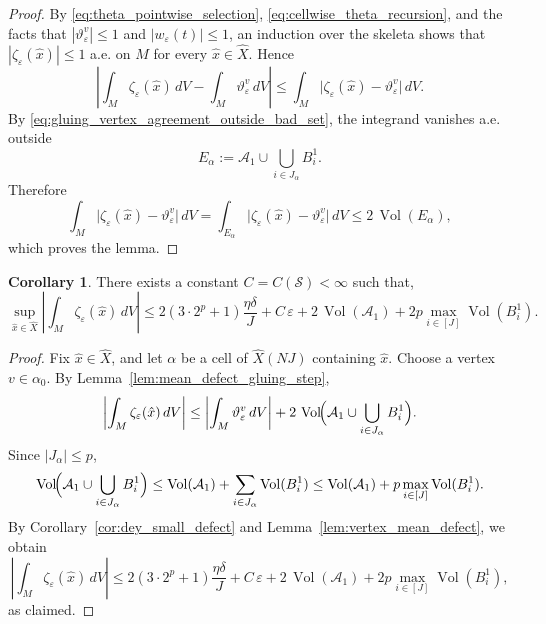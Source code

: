 \documentclass[12pt,english]{article}
\theoremstyle{definition}
\newtheorem{corollary}[theorem]{Corollary}
\begin{document}
\begin{proof}
By \eqref{eq:theta_pointwise_selection}, \eqref{eq:cellwise_theta_recursion}, and the facts that
\(|\vartheta_\varepsilon^v|\le 1\) and \(|w_\varepsilon(t)|\le 1\), an induction over the skeleta shows that $|\zeta_\varepsilon(\hat x)|\le 1$ a.e. on $M$ for every \(\hat x\in\widehat X\). Hence
\[
\left|
\int_M \zeta_\varepsilon(\hat x)\,dV
-
\int_M \vartheta_\varepsilon^v\,dV
\right|
\le
\int_M
\bigl|\zeta_\varepsilon(\hat x)-\vartheta_\varepsilon^v\bigr|\,dV.
\]
By \eqref{eq:gluing_vertex_agreement_outside_bad_set}, the integrand vanishes a.e. outside
\[
E_\alpha:=\mathcal A_1\cup \bigcup_{i\in J_\alpha} B_i^1.
\]
Therefore
\[
\int_M
\bigl|\zeta_\varepsilon(\hat x)-\vartheta_\varepsilon^v\bigr|\,dV
=
\int_{E_\alpha}
\bigl|\zeta_\varepsilon(\hat x)-\vartheta_\varepsilon^v\bigr|\,dV
\le
2\,\operatorname{Vol}(E_\alpha),
\]
which proves the lemma.
\end{proof}

\begin{corollary}\label{cor:mean_defect_glued_family}
There exists a constant \(C=C(\mathscr S)<\infty\) such that,
\[
\sup_{\hat x\in \widehat X}
\left|
\int_M \zeta_\varepsilon(\hat x)\,dV
\right|
\le
2\left(3\cdot 2^p+1\right)\frac{\eta\delta}{J}
+
C\,\varepsilon
+
2\,\operatorname{Vol}(\mathcal A_1)
+
2p\max_{i\in[J]}\operatorname{Vol}(B_i^1).
\]
\end{corollary}

\begin{proof}
Fix \(\hat x\in \widehat X\), and let \(\alpha\) be a cell of \(\widehat X(NJ)\) containing \(\hat x\).
Choose a vertex \(v\in \alpha_0\). By Lemma~\ref{lem:mean_defect_gluing_step},
\[
\left|
\int_M \zeta_\varepsilon(\hat x)\,dV
\right|
\le
\left|
\int_M \vartheta_\varepsilon^v\,dV
\right|
+
2\,\operatorname{Vol}\!\Bigl(\mathcal A_1\cup \bigcup_{i\in J_\alpha} B_i^1\Bigr).
\]
Since \(|J_\alpha|\le p\),
\[
\operatorname{Vol}\!\Bigl(\mathcal A_1\cup \bigcup_{i\in J_\alpha} B_i^1\Bigr)
\le
\operatorname{Vol}(\mathcal A_1)+\sum_{i\in J_\alpha}\operatorname{Vol}(B_i^1)
\le
\operatorname{Vol}(\mathcal A_1)+p\max_{i\in[J]}\operatorname{Vol}(B_i^1).
\]
By Corollary~\ref{cor:dey_small_defect} and Lemma~\ref{lem:vertex_mean_defect}, we obtain
\[
\left|
\int_M \zeta_\varepsilon(\hat x)\,dV
\right|
\le
2\left(3\cdot 2^p+1\right)\frac{\eta\delta}{J}
+
C\,\varepsilon
+
2\,\operatorname{Vol}(\mathcal A_1)
+
2p\max_{i\in[J]}\operatorname{Vol}(B_i^1),
\]
as claimed.
\end{proof}
\end{document}
